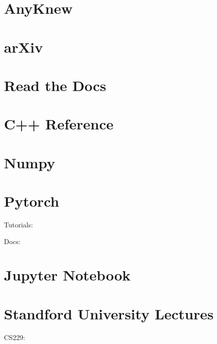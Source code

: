 \documentclass[letterpaper,10pt,english]{sphinxmanual}
\begin{document}
\section{AnyKnew}
\label{\detokenize{link/index:anyknew}}


\section{arXiv}
\label{\detokenize{link/index:arxiv}}


\section{Read the Docs}
\label{\detokenize{link/index:read-the-docs}}


\section{C++ Reference}
\label{\detokenize{link/index:c-reference}}


\section{Numpy}
\label{\detokenize{link/index:numpy}}


\section{Pytorch}
\label{\detokenize{link/index:pytorch}}
Tutorials: 

Docs: 


\section{Jupyter Notebook}
\label{\detokenize{link/index:jupyter-notebook}}


\section{Standford University Lectures}
\label{\detokenize{link/index:standford-university-lectures}}
CS229: 
\end{document}
